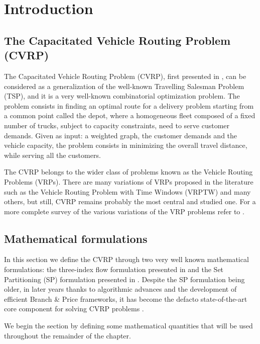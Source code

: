 \chapter{Introduction}

\section{The Capacitated Vehicle Routing Problem (CVRP)}

The Capacitated Vehicle Routing Problem (CVRP), first presented in \textcite{dantzig1959truck},
can be considered as a generalization of
the well-known Travelling Salesman Problem (TSP), and it is a
very well-known combinatorial optimization problem.
The problem consists in finding an optimal route for a delivery problem
starting from a common point called the depot,
where a homogeneous fleet composed of a fixed number of trucks, subject to capacity constraints,
need to serve customer demands.
Given as input: a weighted graph, the customer demands and the vehicle capacity,
the problem consists in minimizing the overall travel distance,
while serving all the customers.

The CVRP belongs to the wider class of problems known as the Vehicle Routing Problems (VRPs).
There are many variations of VRPs proposed in the literature such as
the Vehicle Routing Problem with Time Windows (VRPTW) and many others, but still, CVRP remains
probably the most central and studied one.
For a more complete survey of the various variations of the VRP problems refer to \cite{poggi2014chapter}.

\section{Mathematical formulations}

In this section we define the CVRP through two very well known mathematical formulations:
the three-index flow formulation presented in \textcite{toth_vehicle_2002} and
the Set Partitioning (SP) formulation presented in \textcite{balinski1964integer}.
Despite the SP formulation being older, in later years thanks to algorithmic advances
and the development of efficient Branch \& Price frameworks, it has become the defacto
state-of-the-art core component for solving CVRP problems \parencite{pessoa2020generic}.

We begin the section by defining some mathematical quantities that will be used throughout
the remainder of the chapter.

